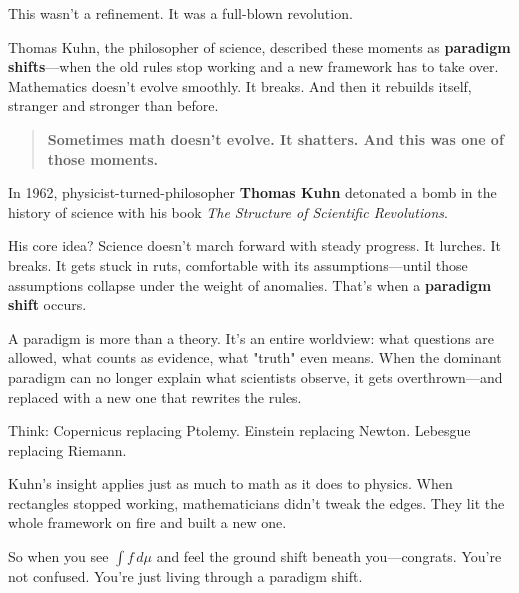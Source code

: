 This wasn’t a refinement. It was a full-blown revolution.

Thomas Kuhn, the philosopher of science, described these moments as \textbf{paradigm shifts}—when the old rules stop working and a new framework has to take over. Mathematics doesn’t evolve smoothly. It breaks. And then it rebuilds itself, stranger and stronger than before.

\begin{quote}
\textbf{Sometimes math doesn’t evolve. It shatters. And this was one of those moments.}
\end{quote}

\begin{tcolorbox}[title=Historical Sidebar: Thomas Kuhn and the Art of the Paradigm Shift, colback=gray!5, colframe=black, fonttitle=\bfseries]

  In 1962, physicist-turned-philosopher \textbf{Thomas Kuhn} detonated a bomb in the history of science with his book \textit{The Structure of Scientific Revolutions}. 

  \medskip
  
  His core idea? Science doesn’t march forward with steady progress. It lurches. It breaks. It gets stuck in ruts, comfortable with its assumptions—until those assumptions collapse under the weight of anomalies.  That’s when a \textbf{paradigm shift} occurs.

  \medskip
  
  A paradigm is more than a theory. It’s an entire worldview: what questions are allowed, what counts as evidence, what "truth" even means. When the dominant paradigm can no longer explain what scientists observe, it gets overthrown—and replaced with a new one that rewrites the rules.

  \medskip
  
  Think: Copernicus replacing Ptolemy. Einstein replacing Newton. Lebesgue replacing Riemann.
  
  \medskip
  
  Kuhn’s insight applies just as much to math as it does to physics. When rectangles stopped working, mathematicians didn’t tweak the edges. They lit the whole framework on fire and built a new one.

  \medskip
  
  So when you see \( \int f \, d\mu \) and feel the ground shift beneath you—congrats. You’re not confused. You’re just living through a paradigm shift.
\end{tcolorbox}


